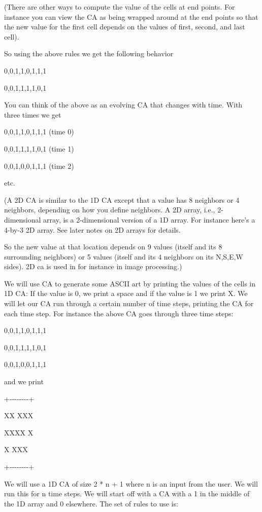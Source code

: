 \documentclass[
]{article}
\begin{document}
(There are other ways to compute the value of the cells at end points.
For instance you can view the CA as being wrapped around at the end
points so that the new value for the first cell depends on the values of
first, second, and last cell).

So using the above rules we get the following behavior

0,0,1,1,0,1,1,1

0,0,1,1,1,1,0,1

You can think of the above as an evolving CA that changes with time.
With three times we get

0,0,1,1,0,1,1,1 (time 0)

0,0,1,1,1,1,0,1 (time 1)

0,0,1,0,0,1,1,1 (time 2)

etc.

(A 2D CA is similar to the 1D CA except that a value has 8 neighbors or
4 neighbors, depending on how you define neighbors. A 2D array, i.e.,
2-dimensional array, is a 2-dimensional version of a 1D array. For
instance here's a 4-by-3 2D array. See later notes on 2D arrays for
details.

So the new value at that location depends on 9 values (itself and its 8
surrounding neighbors) or 5 values (itself and its 4 neighbors on its
N,S,E,W sides). 2D ca is used in for instance in image processing.)

We will use CA to generate some ASCII art by printing the values of the
cells in 1D CA: If the value is 0, we print a space and if the value is
1 we print X. We will let our CA run through a certain number of time
steps, printing the CA for each time step. For instance the above CA
goes through three time steps:

0,0,1,1,0,1,1,1

0,0,1,1,1,1,0,1

0,0,1,0,0,1,1,1

and we print

+-\/-\/-\/-\/-\/-\/-\/-+

\textbar{} XX XXX\textbar{}

\textbar{} XXXX X\textbar{}

\textbar{} X XXX\textbar{}

+-\/-\/-\/-\/-\/-\/-\/-+

We will use a 1D CA of size 2 * n + 1 where n is an input from the user.
We will run this for n time steps. We will start off with a CA with a 1
in the middle of the 1D array and 0 elsewhere. The set of rules to use
is:
\end{document}
